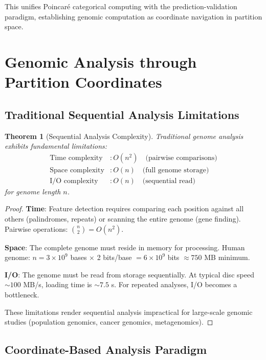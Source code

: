 \documentclass[11pt,a4paper]{article}
\newtheorem{theorem}{Theorem}[section]
\theoremstyle{remark}
\begin{document}
This unifies Poincaré categorical computing with the prediction-validation paradigm, establishing genomic computation as coordinate navigation in partition space.

\section{Genomic Analysis through Partition Coordinates}

\subsection{Traditional Sequential Analysis Limitations}

\begin{theorem}[Sequential Analysis Complexity]
\label{thm:sequential_limitations}
Traditional genome analysis exhibits fundamental limitations:
\begin{align}
\text{Time complexity} &: O(n^2) \quad \text{(pairwise comparisons)} \\
\text{Space complexity} &: O(n) \quad \text{(full genome storage)} \\
\text{I/O complexity} &: O(n) \quad \text{(sequential read)}
\end{align}
for genome length $n$.
\end{theorem}

\begin{proof}
\textbf{Time}: Feature detection requires comparing each position against all others (palindromes, repeats) or scanning the entire genome (gene finding). Pairwise operations: $\binom{n}{2} = O(n^2)$.

\textbf{Space}: The complete genome must reside in memory for processing. Human genome: $n = 3 \times 10^9$ bases $\times$ 2 bits/base $= 6 \times 10^9$ bits $\approx 750$ MB minimum.

\textbf{I/O}: The genome must be read from storage sequentially. At typical disc speed $\sim 100$ MB/s, loading time is $\sim 7.5$ s. For repeated analyses, I/O becomes a bottleneck.

These limitations render sequential analysis impractical for large-scale genomic studies (population genomics, cancer genomics, metagenomics).
\end{proof}

\subsection{Coordinate-Based Analysis Paradigm}
\end{document}
